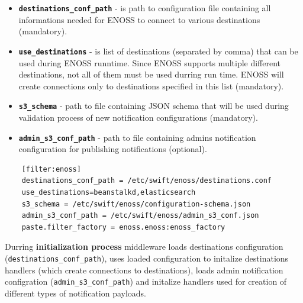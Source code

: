     \begin{itemize}
        \item \textbf{\texttt{destinations\_conf\_path}} - is path to configuration file containing all informations needed for ENOSS to connect to various destinations (mandatory).
        \item \textbf{\texttt{use\_destinations}} - is list of destinations (separated by comma) that can be used during ENOSS runntime. Since ENOSS supports multiple different destinations, not all of them must be used durring run time. ENOSS will create connections only to destinations specified in this list (mandatory).
        \item \textbf{\texttt{s3\_schema}} - path to file containing JSON schema that will be used during validation process of new notification configurations (mandatory).
        \item \textbf{\texttt{admin\_s3\_conf\_path}} - path to file containing admins notification configuration for publishing notifications (optional).
    \end{itemize}

    \lstset{
        caption=Example ENOSS middleware configuration stored in proxy server configuration (proxy-server.conf).,
        label=lst:middlewareConfig
    }
    \begin{lstlisting}
    [filter:enoss]
    destinations_conf_path = /etc/swift/enoss/destinations.conf
    use_destinations=beanstalkd,elasticsearch
    s3_schema = /etc/swift/enoss/configuration-schema.json
    admin_s3_conf_path = /etc/swift/enoss/admin_s3_conf.json
    paste.filter_factory = enoss.enoss:enoss_factory
    \end{lstlisting}

    Durring \textbf{initialization process} middleware loads destinations configuration (\texttt{destinations\_conf\_path}), uses loaded configuration to initalize destinations handlers (which create connections to destinations), loads admin notification configration (\texttt{admin\_s3\_conf\_path}) and initalize handlers used for creation of different types of notification payloads.


